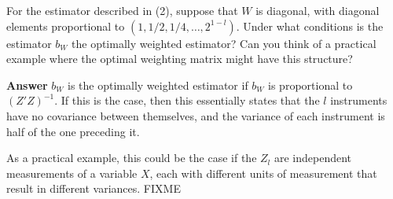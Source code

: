\documentclass[11pt]{exam}
\begin{document}
\begin{questions}
\question For the estimator described in (2), suppose that $W$ is diagonal, with diagonal elements proportional to $(1,1/2,1/4,\ldots,2^{1-l})$. Under what conditions is the estimator $b_W$ the optimally weighted estimator? Can you think of a practical example where the optimal weighting matrix might have this structure?

\textbf{Answer} $b_W$ is the optimally weighted estimator if $b_W$ is proportional to $(Z'Z)^{-1}$. If this is the case, then this essentially states that the $l$ instruments have no covariance between themselves, and the variance of each instrument is half of the one preceding it. 

As a practical example, this could be the case if the $Z_l$ are independent measurements of a variable $X$, each with different units of measurement that result in different variances. FIXME


\end{questions}
    
    
    
\end{document}
